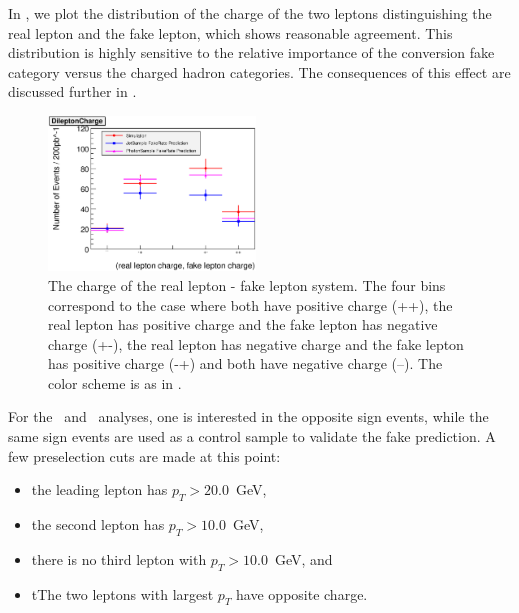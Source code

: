 \documentclass{cmspaper}
\begin{document}

In , we plot the distribution of the charge of the two leptons distinguishing the real lepton and the fake lepton, which shows reasonable agreement. This distribution is highly sensitive to the relative importance of the conversion fake category versus the charged hadron categories. The consequences of this effect are discussed further in .

\begin{figure}[htb]
\begin{center}
\includegraphics[width=0.49\textwidth]{plots/DileptonCharge.eps}
   \caption{The charge of the real lepton - fake lepton system. The four bins correspond to the case where both have positive charge (++), the real lepton has positive charge and the fake lepton has negative charge (+-), the real lepton has negative charge and the fake lepton has positive charge (-+) and both have negative charge (--). The color  scheme is as in .}
   \label{fig:dileptonCharge}
\end{center}
\end{figure}

\begin{minipage}{\textwidth}
For the \WW\ and \HiggsToWW\ analyses, one is interested in the opposite sign events, while the same sign events are used as a control sample to validate the fake prediction. A few preselection cuts are made at this point:

\begin{itemize}
\item the leading lepton has $p_T > 20.0$~GeV,
\item the second lepton has $p_T > 10.0$~GeV,
\item there is no third lepton with $p_T > 10.0$~GeV, and
\item tThe two leptons with largest $p_T$ have opposite charge.
\end{itemize}
\end{minipage}
\end{document}
